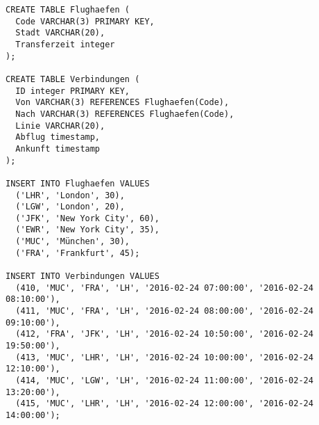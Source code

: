 \documentclass{lehramt-informatik-aufgabe}
\begin{document}
\begin{verbatim}
CREATE TABLE Flughaefen (
  Code VARCHAR(3) PRIMARY KEY,
  Stadt VARCHAR(20),
  Transferzeit integer
);

CREATE TABLE Verbindungen (
  ID integer PRIMARY KEY,
  Von VARCHAR(3) REFERENCES Flughaefen(Code),
  Nach VARCHAR(3) REFERENCES Flughaefen(Code),
  Linie VARCHAR(20),
  Abflug timestamp,
  Ankunft timestamp
);

INSERT INTO Flughaefen VALUES
  ('LHR', 'London', 30),
  ('LGW', 'London', 20),
  ('JFK', 'New York City', 60),
  ('EWR', 'New York City', 35),
  ('MUC', 'München', 30),
  ('FRA', 'Frankfurt', 45);

INSERT INTO Verbindungen VALUES
  (410, 'MUC', 'FRA', 'LH', '2016-02-24 07:00:00', '2016-02-24 08:10:00'),
  (411, 'MUC', 'FRA', 'LH', '2016-02-24 08:00:00', '2016-02-24 09:10:00'),
  (412, 'FRA', 'JFK', 'LH', '2016-02-24 10:50:00', '2016-02-24 19:50:00'),
  (413, 'MUC', 'LHR', 'LH', '2016-02-24 10:00:00', '2016-02-24 12:10:00'),
  (414, 'MUC', 'LGW', 'LH', '2016-02-24 11:00:00', '2016-02-24 13:20:00'),
  (415, 'MUC', 'LHR', 'LH', '2016-02-24 12:00:00', '2016-02-24 14:00:00');
\end{verbatim}
\end{document}

